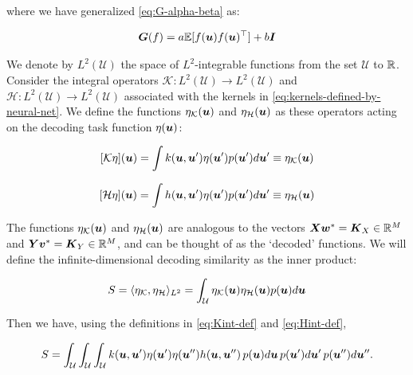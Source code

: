 where we have generalized \cref{eq:G-alpha-beta} as:

\begin{equation}
\boldsymbol{G}(f) = a \mathbb{E}[f(\boldsymbol{u}) f(\boldsymbol{u})^\top] + b \boldsymbol{I}
\end{equation} 

We denote by $L^2(\mathcal{U})$ the space of $L^2$-integrable functions from the set $\mathcal{U}$ to $\mathbb{R}$. 
Consider the integral operators $\mathcal{K}: L^2(\mathcal{U})\rightarrow L^2(\mathcal{U}) $ and $\mathcal{H}: L^2(\mathcal{U})\rightarrow L^2(\mathcal{U})$ associated with the kernels in \cref{eq:kernels-defined-by-neural-net}.
We define the functions $\eta_\mathcal{K}(\boldsymbol{u})$ and $\eta_\mathcal{H}(\boldsymbol{u})$ as these operators acting on the decoding task function $\eta(\boldsymbol{u})$:


\begin{equation}\label{eq:Kint-def}
    [\mathcal{K}\eta](\boldsymbol{u}) = \int k(\boldsymbol{u}, \boldsymbol{u}') \eta(\boldsymbol{u}') p(\boldsymbol{u}') d\boldsymbol{u}' \equiv \eta_\mathcal{K}(\boldsymbol{u}) 
\end{equation}

\begin{equation}\label{eq:Hint-def}
    [\mathcal{H}\eta](\boldsymbol{u}) = \int h(\boldsymbol{u}, \boldsymbol{u}') \eta(\boldsymbol{u}') p(\boldsymbol{u}') d\boldsymbol{u}' \equiv \eta_\mathcal{H}(\boldsymbol{u}) 
\end{equation}


The functions $\eta_\mathcal{K}(\boldsymbol{u})$ and $\eta_\mathcal{H}(\boldsymbol{u})$ are analogous to the  vectors $\boldsymbol{X} \boldsymbol{w}^* = \boldsymbol{K}_{X} \in \mathbb{R}^{M}$ and $\boldsymbol{Y} \boldsymbol{v}^* = \boldsymbol{K}_{Y} \in \mathbb{R}^{M}$, and can be thought of as the `decoded' functions.  
We will define the infinite-dimensional decoding similarity as the inner product:

\begin{equation}
   S =  \langle \eta_{\mathcal{K}}, \eta_{\mathcal{H}} \rangle_{L^2} = \int_{\mathcal{U}}\eta_{\mathcal{K}}(\boldsymbol{u}) \eta_{\mathcal{H}}(\boldsymbol{u}) p(\boldsymbol{u}) d\boldsymbol{u} 
\end{equation}

Then we have, using the definitions in \cref{eq:Kint-def} and \cref{eq:Hint-def},

\begin{equation}
    S =\int_{\mathcal{U}} \int_{\mathcal{U}} \int_{\mathcal{U}} k(\boldsymbol{u}, \boldsymbol{u}') \eta(\boldsymbol{u}') \eta(\boldsymbol{u}'') h(\boldsymbol{u}, \boldsymbol{u}'')\, p(\boldsymbol{u}) d\boldsymbol{u} \,p(\boldsymbol{u}') d\boldsymbol{u}'\, p(\boldsymbol{u}'') d\boldsymbol{u}''.
\end{equation}

